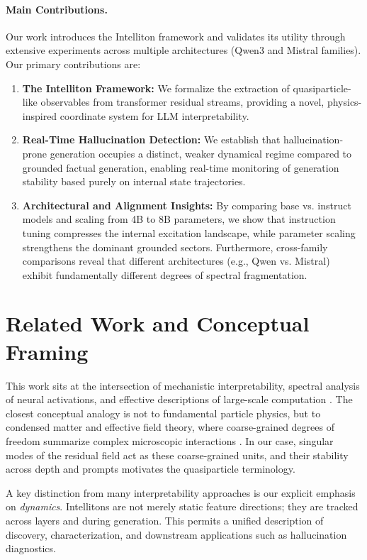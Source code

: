 \documentclass[11pt]{article}
\begin{document}
\paragraph{Main Contributions.}
Our work introduces the Intelliton framework and validates its utility through extensive experiments across multiple architectures (Qwen3 and Mistral families). Our primary contributions are:
\begin{enumerate}[leftmargin=1.5em]
    \item \textbf{The Intelliton Framework:} We formalize the extraction of quasiparticle-like observables from transformer residual streams, providing a novel, physics-inspired coordinate system for LLM interpretability.
    \item \textbf{Real-Time Hallucination Detection:} We establish that hallucination-prone generation occupies a distinct, weaker dynamical regime compared to grounded factual generation, enabling real-time monitoring of generation stability based purely on internal state trajectories.
    \item \textbf{Architectural and Alignment Insights:} By comparing base vs. instruct models and scaling from 4B to 8B parameters, we show that instruction tuning compresses the internal excitation landscape, while parameter scaling strengthens the dominant grounded sectors. Furthermore, cross-family comparisons reveal that different architectures (e.g., Qwen vs. Mistral) exhibit fundamentally different degrees of spectral fragmentation.
\end{enumerate}

\section{Related Work and Conceptual Framing}
This work sits at the intersection of mechanistic interpretability, spectral analysis of neural activations, and effective descriptions of large-scale computation \citep{olah2020zoom,elhage2021mathematical}. The closest conceptual analogy is not to fundamental particle physics, but to condensed matter and effective field theory, where coarse-grained degrees of freedom summarize complex microscopic interactions \citep{wilson1979problems,weinberg1995quantum}. In our case, singular modes of the residual field act as these coarse-grained units, and their stability across depth and prompts motivates the quasiparticle terminology.

A key distinction from many interpretability approaches is our explicit emphasis on \emph{dynamics}. Intellitons are not merely static feature directions; they are tracked across layers and during generation. This permits a unified description of discovery, characterization, and downstream applications such as hallucination diagnostics.
\end{document}
